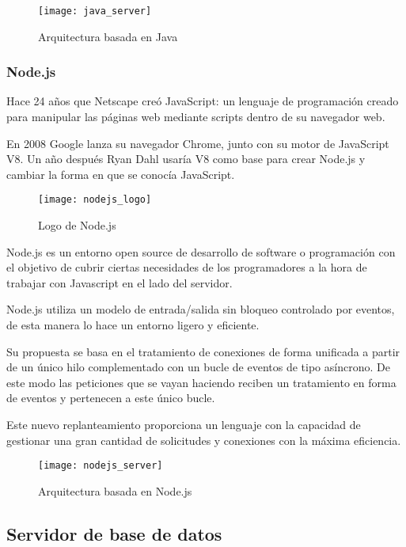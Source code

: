 \begin{figure}[htp!]
  \centering
  \texttt{[image: java\_server]}
  \caption{Arquitectura basada en Java}
  \label{fig:java_server}
\end{figure}

\subsubsection{Node.js}

Hace 24 años que Netscape creó JavaScript: un lenguaje de programación creado para manipular las páginas web mediante scripts dentro de su navegador web.

En 2008 Google lanza su navegador Chrome, junto con su motor de JavaScript V8. Un año después Ryan Dahl usaría V8 como base para crear Node.js y cambiar la forma en que se conocía JavaScript.

\begin{figure}[htp!]
  \centering
  \texttt{[image: nodejs\_logo]}
  \caption{Logo de Node.js}
  \label{fig:nodejs_logo}
\end{figure}

Node.js es un entorno open source de desarrollo de software o programación con el objetivo de cubrir ciertas necesidades de los programadores a la hora de trabajar con Javascript en el lado del servidor.

Node.js utiliza un modelo de entrada/salida sin bloqueo controlado por eventos, de esta manera lo hace un entorno ligero y eficiente.

Su propuesta se basa en el tratamiento de conexiones de forma unificada a partir de un único hilo complementado con un bucle de eventos de tipo asíncrono. De este modo las peticiones que se vayan haciendo reciben un tratamiento en forma de eventos y pertenecen a este único bucle.

Este nuevo replanteamiento proporciona un lenguaje con la capacidad de gestionar una gran cantidad de solicitudes y conexiones con la máxima eficiencia.

\begin{figure}[htp!]
  \centering
  \texttt{[image: nodejs\_server]}
  \caption{Arquitectura basada en Node.js}
  \label{fig:nodejs_server}
\end{figure}

\subsection{Servidor de base de datos}

